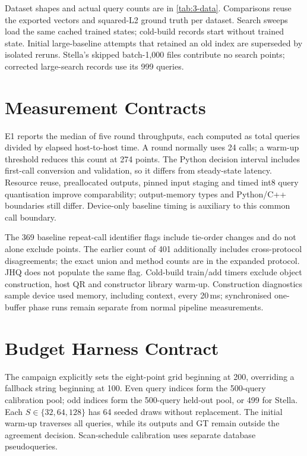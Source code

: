 Dataset shapes and actual query counts are in \cref{tab:3-data}.
Comparisons reuse the exported vectors and squared-L2 ground truth per
dataset. Search sweeps load the same cached trained states;
cold-build records start without trained state. Initial large-baseline attempts that retained an old index are superseded
by isolated reruns. Stella's skipped batch-1,000 files contribute no
search points; corrected large-search records use its 999 queries.

\section{Measurement Contracts}
\label{sec:a-e1-protocol}

E1 reports the median of five round throughputs, each computed as total
queries divided by elapsed host-to-host time. A round normally uses 24
calls; a warm-up threshold reduces this count at 274 points. The Python
decision interval includes first-call conversion and validation, so it
differs from steady-state latency. Resource reuse, preallocated outputs,
pinned input staging and timed int8 query quantisation improve
comparability; output-memory types and Python/C++ boundaries still differ.
Device-only baseline timing is auxiliary to this common call boundary.

The 369 baseline repeat-call identifier flags include tie-order changes
and do not alone exclude points. The earlier count of 401 additionally
includes cross-protocol disagreements; the exact union and method counts
are in the expanded protocol. JHQ does not populate the same flag.
Cold-build train/add timers exclude object construction, host QR and
constructor library warm-up. Construction diagnostics sample device used
memory, including context, every 20\,ms; synchronised one-buffer phase
runs remain separate from normal pipeline measurements.

\section{Budget Harness Contract}
\label{sec:a-budget-contract}

The campaign explicitly sets the eight-point grid beginning at 200,
overriding a fallback string beginning at 100. Even query indices form
the 500-query calibration pool; odd indices form the 500-query held-out
pool, or 499 for Stella. Each $S\in\{32,64,128\}$ has 64 seeded draws
without replacement. The initial warm-up traverses all queries, while
its outputs and GT remain outside the agreement decision. Scan-schedule
calibration uses separate database pseudoqueries.

